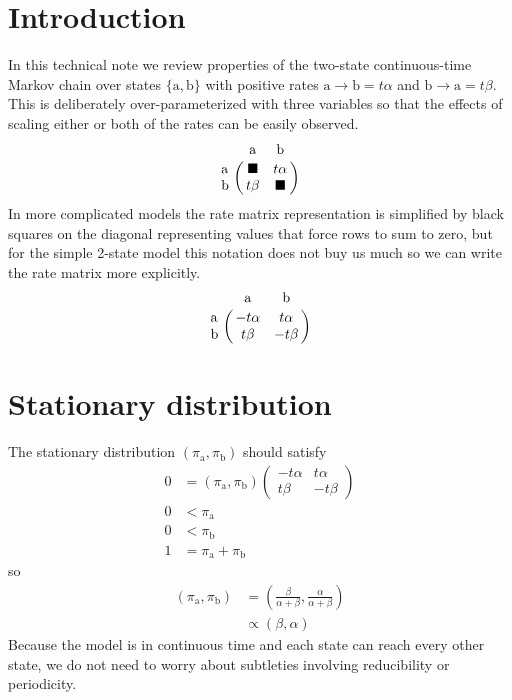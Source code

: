 \documentclass{article}
\providecommand{\Ao}{\text{a}}
\providecommand{\Bo}{\text{b}}
\providecommand{\Pa}{\alpha}
\providecommand{\Pb}{\beta}
\providecommand{\bs}{\blacksquare}
\begin{document}

\section{Introduction}

In this technical note we review properties of the two-state continuous-time
Markov chain over states $\{ \Ao, \Bo \}$ with positive rates
$\Ao \to \Bo = t \Pa$ and $\Bo \to \Ao = t \Pb$.
This is deliberately over-parameterized with three variables so that
the effects of scaling either or both of the rates can be easily observed.
%
\begin{equation}
\bordermatrix{
	    & \Ao  & \Bo  \cr
	\Ao & \bs  & t \Pa \cr
	\Bo & t \Pb & \bs  \cr
}
\end{equation}
%
In more complicated models the rate matrix representation is simplified
by black squares on the diagonal representing values that force
rows to sum to zero, but for the simple 2-state model this notation
does not buy us much so we can write the rate matrix more explicitly.
%
\begin{equation}
\bordermatrix{
	    & \Ao  & \Bo  \cr
	\Ao & - t \Pa  & t \Pa \cr
	\Bo & t \Pb & - t \Pb  \cr
}
\end{equation}

\section{Stationary distribution}

The stationary distribution
$\left( \pi_\Ao, \pi_\Bo \right)$
should satisfy
\begin{align}
0 &=
\left( \pi_\Ao, \pi_\Bo \right)
\begin{pmatrix}
	- t \Pa &  t \Pa \\
	t \Pb & - t \Pb
\end{pmatrix} \\
0 &< \pi_\Ao \\
0 &< \pi_\Bo \\
1 &= \pi_\Ao + \pi_\Bo
\end{align}
%
so
\begin{align}
\left( \pi_\Ao, \pi_\Bo \right)
&=
\left( \frac{\Pb}{\Pa + \Pb}, \frac{\Pa}{\Pa + \Pb} \right) \\
&\propto
\left( \Pb, \Pa \right)
\end{align}
%
Because the model is in continuous time
and each state can reach every other state,
we do not need to worry about subtleties involving reducibility or periodicity.
\end{document}

